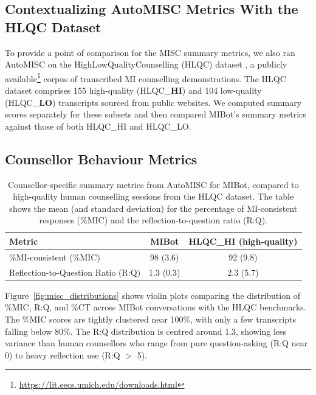 \subsection{Contextualizing AutoMISC Metrics With the HLQC Dataset}
To provide a point of comparison for the MISC summary metrics, we also ran AutoMISC on the HighLowQualityCounselling (HLQC) dataset  \cite{perez-rosas-etal-2019-makes}, a publicly available\footnote{ \url{https://lit.eecs.umich.edu/downloads.html}} corpus of transcribed MI counselling demonstrations. The HLQC dataset comprises 155 high-quality (HLQC\_\textbf{HI}) and 104 low-quality (HLQC\_\textbf{LO}) transcripts sourced from public websites.
We computed summary scores separately for these subsets and then compared MIBot's summary metrics against those of both HLQC\_HI and HLQC\_LO.

\subsection{Counsellor Behaviour Metrics}
\begin{table}[ht]
  \centering
  \small
  \setlength{\tabcolsep}{4pt}
  \renewcommand{\arraystretch}{1.1}
  \begin{tabular}{@{}lcc@{}}
    \toprule
    \textbf{Metric} & \textbf{MIBot} & \textbf{HLQC\_HI (high-quality)} \\
    \midrule
    \%MI-consistent (\%MIC) & 98 (3.6) & 92 (9.8) \\
    Reflection-to-Question Ratio (R:Q) & 1.3 (0.3) & 2.3 (5.7) \\
    \bottomrule
  \end{tabular}
  \caption[AutoMISC Counsellor Metrics for MIBot vs. Human]{Counsellor-specific summary metrics from AutoMISC for MIBot, compared to high-quality human counselling sessions from the HLQC dataset. The table shows the mean (and standard deviation) for the percentage of MI-consistent responses (\%MIC) and the reflection-to-question ratio (R:Q).}
  \label{table:automisc_summary}
\end{table}

Figure~\ref{fig:misc_distributions} shows violin plots comparing the distribution of \%MIC, R:Q, and \%CT across MIBot conversations with the HLQC benchmarks. The \%MIC scores are tightly clustered near 100\%, with only a few transcripts falling below 80\%. The R:Q distribution is centred around 1.3, showing less variance than human counsellors who range from pure question-asking (R:Q near 0) to heavy reflection use (R:Q $>$ 5).

